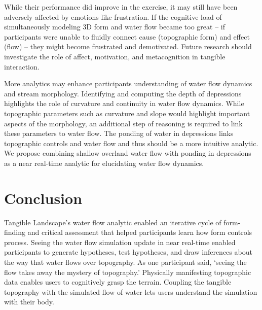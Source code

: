\documentclass{isprs}
\begin{document}
While their performance did improve in the  exercise, it may still have been adversely affected by emotions like frustration. 
%
If the cognitive load of simultaneously modeling 3D form and water flow became too great
-- if participants were unable to fluidly connect cause (topographic form) and effect (flow) --
they might become frustrated and demotivated. 
%
Future research should investigate the role of affect, motivation, and metacognition in tangible interaction.

More analytics may enhance participants understanding of water flow dynamics and stream morphology. 
%
Identifying and computing the depth of depressions highlights the role of curvature and continuity in water flow dynamics. 
%
While topographic parameters such as curvature and slope would highlight important aspects of the morphology, 
an additional step of reasoning is required to link these parameters to water flow. 
%
The ponding of water in depressions links topographic controls and water flow 
and thus should be a more intuitive analytic. 
%
We propose combining shallow overland water flow with ponding in depressions
as a near real-time analytic
for elucidating water flow dynamics. 


\section{Conclusion}\label{sec:conclusion}
%
Tangible Landscape's water flow analytic enabled an iterative cycle of form-finding and critical assessment that helped participants learn how form controls process. 
%
Seeing the water flow simulation update in near real-time 
enabled participants to generate hypotheses, test hypotheses, and draw inferences 
about the way that water flows over topography. 
%
As one participant said, `seeing the flow takes away the mystery of topography.' 
%
%
Physically manifesting topographic data enables users to cognitively grasp the terrain. 
Coupling the tangible topography with the simulated flow of water 
lets users understand the simulation with their body. 


 
\end{document}
